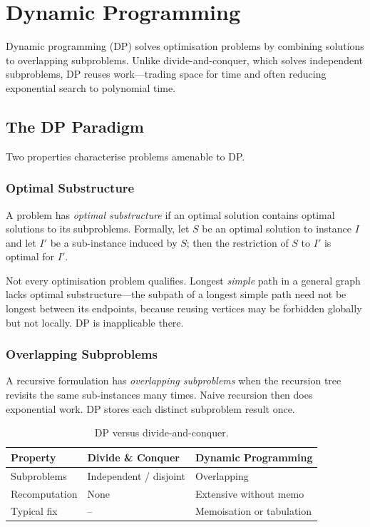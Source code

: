 \chapter{Dynamic Programming}
\label{ch:dp}

Dynamic programming (DP) solves optimisation problems by combining solutions to overlapping subproblems. Unlike divide-and-conquer, which solves independent subproblems, DP reuses work---trading space for time and often reducing exponential search to polynomial time.

\section{The DP Paradigm}
\label{sec:dp-paradigm}

Two properties characterise problems amenable to DP.

\subsection{Optimal Substructure}

A problem has \emph{optimal substructure} if an optimal solution contains optimal solutions to its subproblems. Formally, let $S$ be an optimal solution to instance $I$ and let $I'$ be a sub-instance induced by $S$; then the restriction of $S$ to $I'$ is optimal for $I'$.

Not every optimisation problem qualifies. Longest \emph{simple} path in a general graph lacks optimal substructure---the subpath of a longest simple path need not be longest between its endpoints, because reusing vertices may be forbidden globally but not locally. DP is inapplicable there.

\subsection{Overlapping Subproblems}

A recursive formulation has \emph{overlapping subproblems} when the recursion tree revisits the same sub-instances many times. Naive recursion then does exponential work. DP stores each distinct subproblem result once.

\begin{table}[h]
\centering
\begin{tabular}{lll}
\toprule
Property & Divide \& Conquer & Dynamic Programming \\
\midrule
Subproblems & Independent / disjoint & Overlapping \\
Recomputation & None & Extensive without memo \\
Typical fix & -- & Memoisation or tabulation \\
\bottomrule
\end{tabular}
\caption{DP versus divide-and-conquer.}
\end{table}

